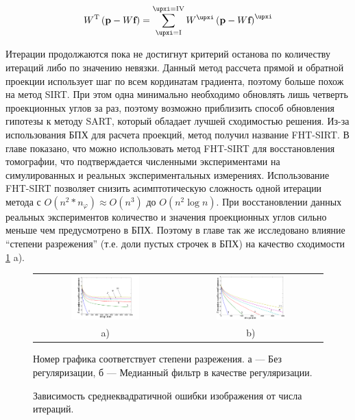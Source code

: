\begin{equation} \notag
W^{\mathrm T}\left( \textbf p - W \textbf f\right) = \sum_{\xi = \rom{1}} ^{\xi = \rom{4}} {W^{\xi} \left(\textbf p - W \textbf f \right)^{\xi}}
\end{equation}

Итерации продолжаются пока не достигнут критерий останова по количеству итераций либо по значению невязки.
Данный метод рассчета прямой и обратной проекции использует шаг по всем кординатам градиента, поэтому больше похож на метод SIRT.
При этом одна минимально необходимо обновлять лишь четверть проекционных углов за раз, поэтому возможно приблизить способ обновления гипотезы к методу SART, который обладает лучшей сходимостью решения.
Из-за использования БПХ для расчета проекций, метод получил название FHT-SIRT.
В главе показано, что можно использовать метод FHT-SIRT для восстановления томографии, что подтверждается численными экспериментами на симулированных и реальных экспериментальных измерениях.
Использование FHT-SIRT позволяет снизить асимптотическую сложность одной итерации метода с $O(n^2 * n_\varphi) \approx O(n^3)$ до $O(n^2 \log n)$.
При восстановлении данных реальных экспериментов количество и значения проекционных углов сильно меньше чем предусмотрено в БПХ. 
Поэтому в главе так же исследовано влияние ``степени разрежения'' (т.е. доли пустых строчек в БПХ) на качество сходимости \ref{fig:conv_all} a).

\begin{figure}
\centering
\begin{tabular}{@{}c@{}c}
    \includegraphics[width=0.50\textwidth]{Dissertation/images/part1_img/raw}
&
    \includegraphics[width=0.50\textwidth]{Dissertation/images/part1_img/medk}
\\
   \small a) & \small b)
\end{tabular}
  \caption{Зависимость среднеквадратичной ошибки изображения от числа итераций.}
Номер графика соответствует степени разрежения. а --- Без регуляризации, б --- Медианный фильтр в качестве регуляризации.
\label{fig:conv_all}
\end{figure}

